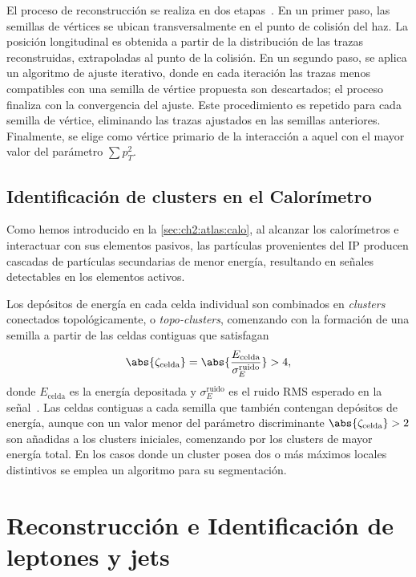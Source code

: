 El proceso de reconstrucción se realiza en dos etapas~\cite{Meloni2016,Boutle2017,ATL-PHYS-PUB-2015-026}. En un primer paso, las semillas de vértices se ubican transversalmente en el punto de colisión del haz. La posición longitudinal es obtenida a partir de la distribución de las trazas reconstruidas, extrapoladas al punto de la colisión. En un segundo paso, se aplica un algoritmo de ajuste iterativo, donde en cada iteración las trazas menos compatibles con una semilla de vértice propuesta son descartados; el proceso finaliza con la convergencia del ajuste. Este procedimiento es repetido para cada semilla de vértice, eliminando las trazas ajustados en las semillas anteriores. Finalmente, se elige como vértice primario de la interacción a aquel con el mayor valor del parámetro $\sum p_T^2$.


\subsection{Identificación de clusters en el Calorímetro}

Como hemos introducido en la \cref{sec:ch2:atlas:calo}, al alcanzar los calorímetros e interactuar con sus elementos pasivos, las partículas provenientes del IP producen cascadas de partículas secundarias de menor energía, resultando en señales detectables en los elementos activos.

Los depósitos de energía en cada celda individual son combinados en \textit{clusters} conectados topológicamente, o \textit{topo-clusters}, comenzando con la formación de una semilla a partir de las celdas contiguas que satisfagan
\[ \abs{\zeta_{\text{celda}}} = \abs{\frac{E_{\text{celda}}}{\sigma_{E}^{\text{ruido}}}} > 4, \]
donde $E_{\text{celda}}$ es la energía depositada y $\sigma_{E}^{\text{ruido}}$ es el ruido RMS esperado en la señal~\cite{Benslama2008}. Las celdas contiguas a cada semilla que también contengan depósitos de energía, aunque con un valor menor del parámetro discriminante $\abs{\zeta_{\text{celda}}} > 2$ son añadidas a los clusters iniciales, comenzando por los clusters de mayor energía total. En los casos donde un cluster posea dos o más máximos locales distintivos se emplea un algoritmo para su segmentación.




\section[Reconstrucción en Identificación de leptones y jets]{Reconstrucción e Identificación de \\ leptones y jets}

